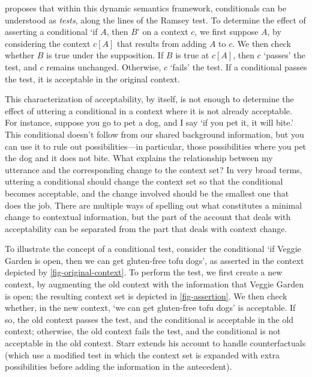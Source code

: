 \citet{Starr2014-STAAUT-2} proposes that within this dynamic semantics framework, conditionals can be understood as \emph{tests}, along the lines of the Ramsey test.  To determine the effect of asserting a conditional `if $A$, then $B$' on a context $c$, we first suppose $A$, by considering the context $c[A]$ that results from adding $A$ to $c$.  We then check whether $B$ is true under the supposition.  If $B$ is true at $c[A]$, then $c$ `passes' the test, and $c$ remains unchanged.  Otherwise, $c$ `fails' the test.  If a conditional passes the test, it is acceptable in the original context.

This characterization of acceptability, by itself, is not enough to determine the effect of uttering a conditional in a context where it is not already acceptable.  For instance, suppose you go to pet a dog, and I say `if you pet it, it will bite.'  This conditional doesn't follow from our shared background information, but you can use it to rule out possibilities---in particular, those possibilities where you pet the dog and it does not bite.  What explains the relationship between my utterance and the corresponding change to the context set?  In very broad terms, uttering a conditional should change the context set so that the conditional becomes acceptable, and the change involved should be the smallest one that does the job.  There are multiple ways of spelling out what constitutes a minimal change to contextual information, but the part of the account that deals with acceptability can be separated from the part that deals with context change.

To illustrate the concept of a conditional test, consider the conditional `if Veggie Garden is open, then we can get gluten-free tofu dogs', as asserted in the context depicted by \autoref{fig-original-context}.  To perform the test, we first create a new context, by augmenting the old context with the information that Veggie Garden is open; the resulting context set is depicted in \autoref{fig-assertion}.  We then check whether, in the new context, `we can get gluten-free tofu dogs' is acceptable.  If so, the old context passes the test, and the conditional is acceptable in the old context; otherwise, the old context fails the test, and the conditional is not acceptable in the old context. Starr extends his account to handle counterfactuals (which use a modified test in which the context set is expanded with extra possibilities before adding the information in the antecedent).

